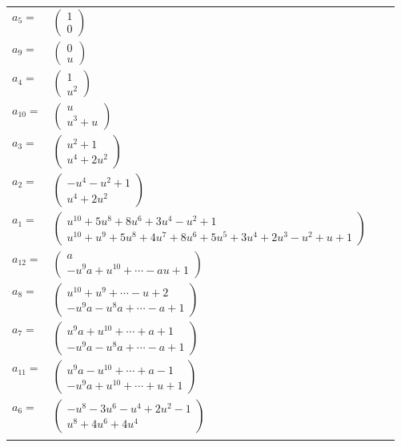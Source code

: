 \documentclass[1p]{elsarticle_modified}
\theoremstyle{definition}
\begin{document}
\begin{tabular}{m{7pt} m{180pt} m{7pt} m{180pt} }
\flushright $a_{5}=$&$\begin{pmatrix}1\\0\end{pmatrix}$ \\
\flushright $a_{9}=$&$\begin{pmatrix}0\\u\end{pmatrix}$ \\
\flushright $a_{4}=$&$\begin{pmatrix}1\\u^2\end{pmatrix}$ \\
\flushright $a_{10}=$&$\begin{pmatrix}u\\u^3+u\end{pmatrix}$ \\
\flushright $a_{3}=$&$\begin{pmatrix}u^2+1\\u^4+2 u^2\end{pmatrix}$ \\
\flushright $a_{2}=$&$\begin{pmatrix}- u^4- u^2+1\\u^4+2 u^2\end{pmatrix}$ \\
\flushright $a_{1}=$&$\begin{pmatrix}u^{10}+5 u^8+8 u^6+3 u^4- u^2+1\\u^{10}+u^9+5 u^8+4 u^7+8 u^6+5 u^5+3 u^4+2 u^3- u^2+u+1\end{pmatrix}$ \\
\flushright $a_{12}=$&$\begin{pmatrix}a\\- u^9 a+u^{10}+\cdots- a u+1\end{pmatrix}$ \\
\flushright $a_{8}=$&$\begin{pmatrix}u^{10}+u^9+\cdots- u+2\\- u^9 a- u^8 a+\cdots- a+1\end{pmatrix}$ \\
\flushright $a_{7}=$&$\begin{pmatrix}u^9 a+u^{10}+\cdots+a+1\\- u^9 a- u^8 a+\cdots- a+1\end{pmatrix}$ \\
\flushright $a_{11}=$&$\begin{pmatrix}u^9 a- u^{10}+\cdots+a-1\\- u^9 a+u^{10}+\cdots+u+1\end{pmatrix}$ \\
\flushright $a_{6}=$&$\begin{pmatrix}- u^8-3 u^6- u^4+2 u^2-1\\u^8+4 u^6+4 u^4\end{pmatrix}$\\&\end{tabular}
\end{document}

